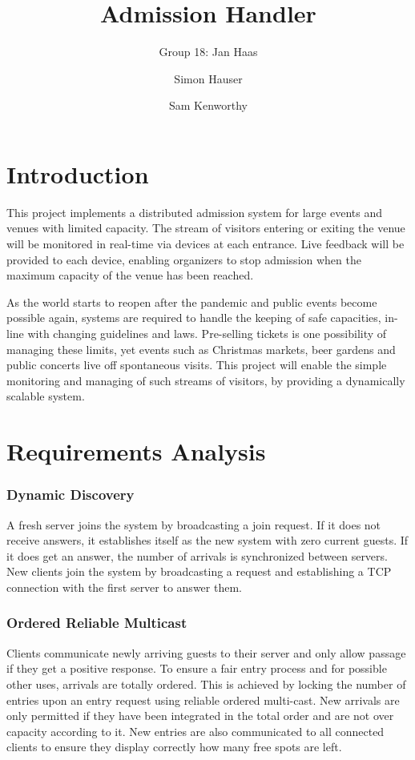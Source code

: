 \documentclass[runningheads]{llncs}
\begin{document}
%
\title{Admission Handler}

\author{Group 18: Jan Haas \and Simon Hauser \and Sam Kenworthy}

\institute{}
%
\maketitle              %

\section{Introduction}
This project implements a distributed admission system for large events and venues with limited capacity.
The stream of visitors entering or exiting the venue will be monitored in real-time via devices at each entrance.
Live feedback will be provided to each device, enabling organizers to stop admission when the maximum capacity of the venue has been reached.

As the world starts to reopen after the pandemic and public events become possible again, systems are required to handle the keeping of safe capacities, in-line with changing guidelines and laws.
Pre-selling tickets is one possibility of managing these limits, yet events such as Christmas markets, beer gardens and public concerts live off spontaneous visits.
This project will enable the simple monitoring and managing of such streams of visitors, by providing a dynamically scalable system.

\section{Requirements Analysis}
\subsubsection{Dynamic Discovery}
A fresh server joins the system by broadcasting a join request.
If it does not receive answers, it establishes itself as the new system with zero current guests.
If it does get an answer, the number of arrivals is synchronized between servers.
New clients join the system by broadcasting a request and establishing a TCP connection with the first server to answer them.

\subsubsection{Ordered Reliable Multicast}
Clients communicate newly arriving guests to their server and only allow passage if they get a positive response.
To ensure a fair entry process and for possible other uses, arrivals are totally ordered.
This is achieved by locking the number of entries upon an entry request using reliable ordered multi-cast.
New arrivals are only permitted if they have been integrated in the total order and are not over capacity according to it.
New entries are also communicated to all connected clients to ensure they display correctly how many free spots are left.
\end{document}
